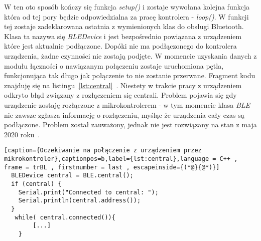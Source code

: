 W ten oto sposób kończy się funkcja \textit{setup()} i zostaje wywołana kolejna funkcja która od tej pory będzie odpowiedzialna za pracę kontrolera - \textit{loop()}. W funkcji tej zostaje zadeklarowana ostatnia z wymienionych klas do obsługi Bluetooth. Klasa ta nazywa się \textit{BLEDevice} i jest bezpośrednio powiązana z urządzeniem które jest aktualnie podłączone. Dopóki nie ma podłączonego do kontrolera urządzenia, żadne czynności nie zostają podjęte. W momencie uzyskania danych z modułu łączności o nawiązanym połączeniu zostaje uruchomiona pętla, funkcjonująca tak długo jak połączenie to nie zostanie przerwane. Fragment kodu znajduję się na listingu~\ref{lst:central}~\cite{ArduinoBLE}. Niestety w trakcie pracy z urządzeniem odkryto błąd związany z rozłączeniem się centrali. Problem pojawia się gdy urządzenie zostaję rozłączone z mikrokontrolerem - w tym momencie klasa \textit{BLE} nie zawsze zgłasza informację o rozłączeniu, myśląc że urządzenia cały czas są podłączone. Problem został zauważony, jednak nie jest rozwiązany na stan z maja 2020 roku~\cite{ArduinoBug}. 
\begin{lstlisting}[caption={Oczekiwanie na połączenie z urządzeniem przez mikrokontroler},captionpos=b,label={lst:central},language = C++ , frame = trBL , firstnumber = last , escapeinside={(*@}{@*)}]
  BLEDevice central = BLE.central();
  if (central) {
    Serial.print("Connected to central: ");
    Serial.println(central.address());
  }  
   while( central.connected()){ 
   		[...]
   	}
\end{lstlisting}
